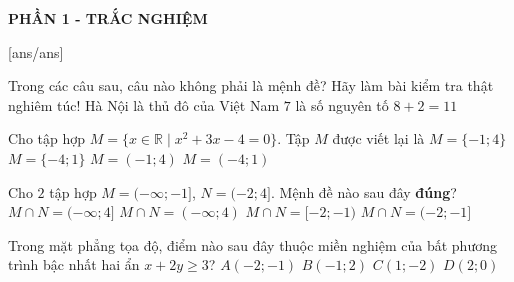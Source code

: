 
\begin{center}
	\textbf{PHẦN 1 - TRẮC NGHIỆM}
\end{center}
[ans/ans]

\begin{ex}%
Trong các câu sau, câu nào không phải là mệnh đề?
\choice
{\True Hãy làm bài kiểm tra thật nghiêm túc!}
{Hà Nội là thủ đô của Việt Nam}
{$7$ là số nguyên tố}
{$8+2=11$}
\end{ex}

\begin{ex}%
Cho tập hợp $M=\{x\in\mathbb{R}\mid x^2+3x-4=0\}$. Tập $M$ được viết lại là
\choice
{$M=\{-1;4\}$}
{\True $M=\{-4;1\}$}
{$M=(-1;4)$}
{$M=(-4;1)$}
\loigiai{
	Ta có $x^2+3x-4=0 \Leftrightarrow \left[\begin{aligned}
	&x=1\\	&x=-4.\\
	\end{aligned}\right.$\\
Vậy $M=\{-4;1\}$.
}%
\end{ex}

\begin{ex}%
Cho $2$ tập hợp $M=(-\infty ;-1]$, $N=(-2;4]$. Mệnh đề nào sau đây \textbf{đúng}?
\choice
{$M\cap N=(-\infty; 4]$}
{$M\cap N=(-\infty; 4)$}
{$M\cap N=[-2; -1)$}
{\True $M\cap N=(-2; -1]$}
\loigiai{
	Ta có $M\cap N=(-\infty ;-1]\cap (-2;4]=(-2; -1]$.
}%
\end{ex}

\begin{ex}%
Trong mặt phẳng tọa độ, điểm nào sau đây thuộc miền nghiệm của bất phương trình bậc nhất hai ẩn $x+2y \ge 3$?
\choice
{$A(-2; -1)$}
{\True $B(-1; 2)$}
{$C(1; -2)$}
{$D(2; 0)$}
\end{ex}


